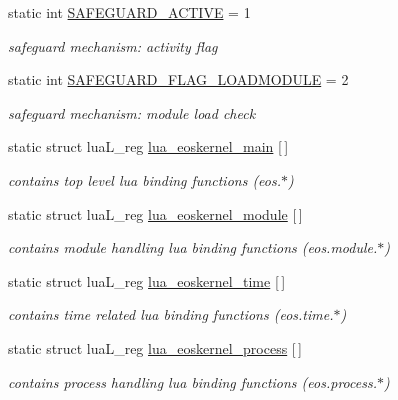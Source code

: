 \begin{CompactItemize}
\item 
static int \hyperlink{structEOSKernel_c952db283e29f0b6927b130da6396d20}{SAFEGUARD\_\-ACTIVE} = 1
\begin{CompactList}\small\item\em safeguard mechanism: activity flag \item\end{CompactList}\item 
static int \hyperlink{structEOSKernel_c97927724be5b7c2eebf92739155ca0d}{SAFEGUARD\_\-FLAG\_\-LOADMODULE} = 2
\begin{CompactList}\small\item\em safeguard mechanism: module load check \item\end{CompactList}\item 
static struct luaL\_\-reg \hyperlink{structEOSKernel_b6b80a3e788ce2d8efcfc693d1e2e24c}{lua\_\-eoskernel\_\-main} \mbox{[}$\,$\mbox{]}
\begin{CompactList}\small\item\em contains top level lua binding functions (eos.$\ast$) \item\end{CompactList}\item 
static struct luaL\_\-reg \hyperlink{structEOSKernel_369f2e0709ea1be66f5f47dd5e861025}{lua\_\-eoskernel\_\-module} \mbox{[}$\,$\mbox{]}
\begin{CompactList}\small\item\em contains module handling lua binding functions (eos.module.$\ast$) \item\end{CompactList}\item 
static struct luaL\_\-reg \hyperlink{structEOSKernel_ffcec7d380b132f1dbebfd46b83f5c8d}{lua\_\-eoskernel\_\-time} \mbox{[}$\,$\mbox{]}
\begin{CompactList}\small\item\em contains time related lua binding functions (eos.time.$\ast$) \item\end{CompactList}\item 
static struct luaL\_\-reg \hyperlink{structEOSKernel_077213f420729c5a87f04c29fd14ce21}{lua\_\-eoskernel\_\-process} \mbox{[}$\,$\mbox{]}
\begin{CompactList}\small\item\em contains process handling lua binding functions (eos.process.$\ast$) \item\end{CompactList}\item 

\end{CompactItemize}
